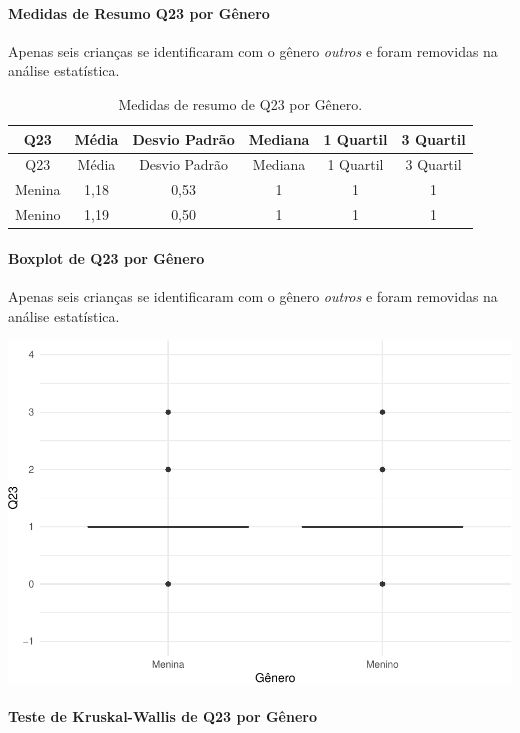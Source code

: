 \documentclass[]{article}
\let\oldparagraph\paragraph
\renewcommand{\paragraph}[1]{\oldparagraph{#1}\mbox{}}
\begin{document}
\hypertarget{medidas-de-resumo-q23-por-guxeanero}{%
\paragraph{Medidas de Resumo Q23 por Gênero}\label{medidas-de-resumo-q23-por-guxeanero}}

Apenas seis crianças se identificaram com o gênero \emph{outros} e foram removidas na análise estatística.

\begin{longtable}[]{@{}cccccc@{}}
\caption{\label{tab:unnamed-chunk-557}Medidas de resumo de Q23 por Gênero.}\tabularnewline
\toprule
Q23 & Média & Desvio Padrão & Mediana & 1 Quartil & 3 Quartil\tabularnewline
\midrule
\endfirsthead
\toprule
Q23 & Média & Desvio Padrão & Mediana & 1 Quartil & 3 Quartil\tabularnewline
\midrule
\endhead
Menina & 1,18 & 0,53 & 1 & 1 & 1\tabularnewline
Menino & 1,19 & 0,50 & 1 & 1 & 1\tabularnewline
\bottomrule
\end{longtable}

\hypertarget{boxplot-de-q23-por-guxeanero}{%
\paragraph{Boxplot de Q23 por Gênero}\label{boxplot-de-q23-por-guxeanero}}

Apenas seis crianças se identificaram com o gênero \emph{outros} e foram removidas na análise estatística.

\begin{center}\includegraphics[width=0.75\linewidth]{relatorio_covid19_files/figure-latex/unnamed-chunk-558-1} \end{center}

\hypertarget{teste-de-kruskal-wallis-de-q23-por-guxeanero}{%
\paragraph{Teste de Kruskal-Wallis de Q23 por Gênero}\label{teste-de-kruskal-wallis-de-q23-por-guxeanero}}
\end{document}

